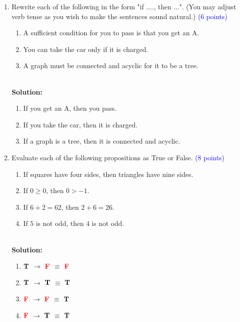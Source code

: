 \documentclass{article}
\newcommand{\pt}[1]{\textcolor{blue}{(#1 points)}}
\newenvironment{solution}
{
\par
\color{blue}
\vspace{2mm}
\hline \\
\textbf{Solution:}
}
{
\vspace{2mm}
\newpage
}
\newcommand{\T}{\color{black} \textbf{T}}
\newcommand{\F}{\color{red} \textbf{F}}
\begin{document}
\begin{enumerate}

    \item Rewrite each of the following in the form "if ...., then ...".  (You may adjust verb tense as you wish to make the sentences sound natural.) \pt 6
    \begin{enumerate}
        \item A sufficient condition for you to pass is that you get an A.
        \item You can take the car only if it is charged.
        \item A graph must be connected and acyclic for it to be a tree.
    \end{enumerate} 
    
    \begin{solution}
    \begin{enumerate}
        \item If you get an A, then you pass.
        \item If you take the car, then it is charged.
        \item If a graph is a tree, then it is connected and acyclic.
    \end{enumerate}
    \end{solution}
    
    \item Evaluate each of the following propositions as True or False. \pt 8
    \begin{enumerate}
        \item If squares have four sides, then triangles have nine sides.
        \item If $0 \geq 0$, then $0 > -1$.
        \item If $6+2 = 62$, then $2+6=26$.
        \item If $5$ is not odd, then $4$ is not odd. 
    \end{enumerate}
    
    \begin{solution}
    \begin{enumerate}
        \item $\T$ $\rightarrow$ $\F$ $\equiv$ $\F$
        \item $\T$ $\rightarrow$ $\T$ $\equiv$ $\T$
        \item $\F$ $\rightarrow$ $\F$ $\equiv$ $\T$
        \item $\F$ $\rightarrow$ $\T$ $\equiv$ $\T$
    \end{enumerate}
    \end{solution}
    

\end{enumerate}
\end{document}
